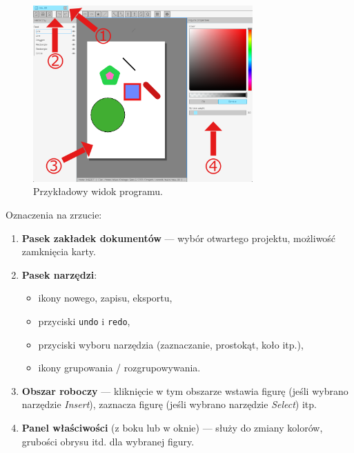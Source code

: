 \documentclass[a4paper,12pt]{article}
\begin{document}
\begin{figure}[h!]
    \centering
    \includegraphics[width=0.75\textwidth]{./vecedit_screenshot.png}
    \caption{Przykładowy widok programu.}
    \label{fig:screenshot}
\end{figure}

\noindent Oznaczenia na zrzucie:
\begin{enumerate}
    \item \textbf{Pasek zakładek dokumentów} — wybór otwartego projektu, 
    możliwość zamknięcia karty.
    \item \textbf{Pasek narzędzi}:
    \begin{itemize}
      \item ikony nowego, zapisu, eksportu,
      \item przyciski \texttt{undo} i \texttt{redo},
      \item przyciski wyboru narzędzia (zaznaczanie, prostokąt, koło itp.),
      \item ikony grupowania / rozgrupowywania.
    \end{itemize}
    \item \textbf{Obszar roboczy} — kliknięcie w tym obszarze wstawia figurę 
    (jeśli wybrano narzędzie \emph{Insert}), zaznacza figurę (jeśli wybrano 
    narzędzie \emph{Select}) itp.
    \item \textbf{Panel właściwości} (z boku lub w oknie) — służy do zmiany 
    kolorów, grubości obrysu itd. dla wybranej figury.
\end{enumerate}
\end{document}
